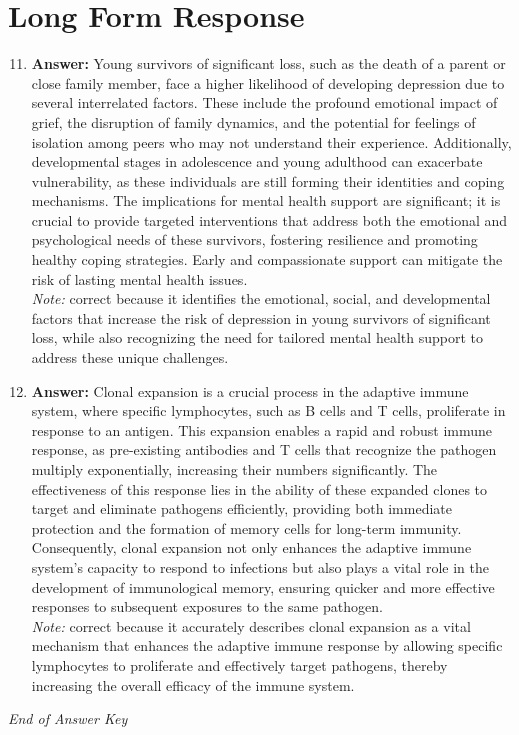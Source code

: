 \documentclass[12pt]{article}
\begin{document}
\section*{Long Form Response}
\begin{enumerate}[label=\arabic*.]
\setcounter{enumi}{10}
\item \textbf{Answer:} Young survivors of significant loss, such as the death of a parent or close family member, face a higher likelihood of developing depression due to several interrelated factors. These include the profound emotional impact of grief, the disruption of family dynamics, and the potential for feelings of isolation among peers who may not understand their experience. Additionally, developmental stages in adolescence and young adulthood can exacerbate vulnerability, as these individuals are still forming their identities and coping mechanisms. The implications for mental health support are significant; it is crucial to provide targeted interventions that address both the emotional and psychological needs of these survivors, fostering resilience and promoting healthy coping strategies. Early and compassionate support can mitigate the risk of lasting mental health issues.
\\ \textit{Note:} correct because it identifies the emotional, social, and developmental factors that increase the risk of depression in young survivors of significant loss, while also recognizing the need for tailored mental health support to address these unique challenges.
\item \textbf{Answer:} Clonal expansion is a crucial process in the adaptive immune system, where specific lymphocytes, such as B cells and T cells, proliferate in response to an antigen. This expansion enables a rapid and robust immune response, as pre-existing antibodies and T cells that recognize the pathogen multiply exponentially, increasing their numbers significantly. The effectiveness of this response lies in the ability of these expanded clones to target and eliminate pathogens efficiently, providing both immediate protection and the formation of memory cells for long-term immunity. Consequently, clonal expansion not only enhances the adaptive immune system's capacity to respond to infections but also plays a vital role in the development of immunological memory, ensuring quicker and more effective responses to subsequent exposures to the same pathogen.
\\ \textit{Note:} correct because it accurately describes clonal expansion as a vital mechanism that enhances the adaptive immune response by allowing specific lymphocytes to proliferate and effectively target pathogens, thereby increasing the overall efficacy of the immune system.
\end{enumerate}

\vfill
\noindent\textit{End of Answer Key}
\end{document}
